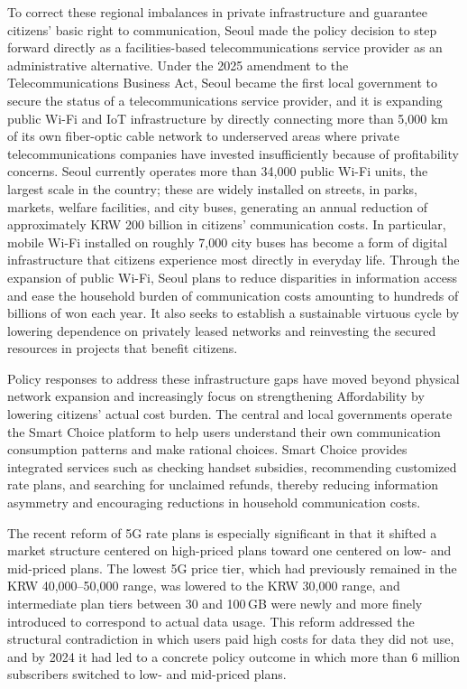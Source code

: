
To correct these regional imbalances in private infrastructure and guarantee citizens' basic right to communication, Seoul made the policy decision to step forward directly as a facilities-based telecommunications service provider as an administrative alternative. Under the 2025 amendment to the Telecommunications Business Act, Seoul became the first local government to secure the status of a telecommunications service provider, and it is expanding public Wi-Fi and IoT infrastructure by directly connecting more than 5,000 km of its own fiber-optic cable network to underserved areas where private telecommunications companies have invested insufficiently because of profitability concerns. Seoul currently operates more than 34,000 public Wi-Fi units, the largest scale in the country; these are widely installed on streets, in parks, markets, welfare facilities, and city buses, generating an annual reduction of approximately KRW 200 billion in citizens' communication costs. In particular, mobile Wi-Fi installed on roughly 7,000 city buses has become a form of digital infrastructure that citizens experience most directly in everyday life. Through the expansion of public Wi-Fi, Seoul plans to reduce disparities in information access and ease the household burden of communication costs amounting to hundreds of billions of won each year. It also seeks to establish a sustainable virtuous cycle by lowering dependence on privately leased networks and reinvesting the secured resources in projects that benefit citizens.

Policy responses to address these infrastructure gaps have moved beyond physical network expansion and increasingly focus on strengthening Affordability by lowering citizens' actual cost burden. The central and local governments operate the Smart Choice platform to help users understand their own communication consumption patterns and make rational choices. Smart Choice provides integrated services such as checking handset subsidies, recommending customized rate plans, and searching for unclaimed refunds, thereby reducing information asymmetry and encouraging reductions in household communication costs.

The recent reform of 5G rate plans is especially significant in that it shifted a market structure centered on high-priced plans toward one centered on low- and mid-priced plans. The lowest 5G price tier, which had previously remained in the KRW 40,000--50,000 range, was lowered to the KRW 30,000 range, and intermediate plan tiers between 30 and 100\,GB were newly and more finely introduced to correspond to actual data usage. This reform addressed the structural contradiction in which users paid high costs for data they did not use, and by 2024 it had led to a concrete policy outcome in which more than 6 million subscribers switched to low- and mid-priced plans.

